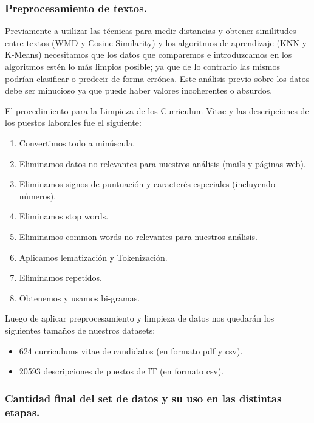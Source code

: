 \documentclass[12pt,a4paper]{article}
\begin{document}
\begin{sloppypar}
\cleardoublepage

\subsubsection{Preprocesamiento de textos.}
Previamente a utilizar las técnicas para medir distancias y obtener similitudes entre textos (WMD y Cosine Similarity) y los algoritmos de aprendizaje (KNN y K-Means) necesitamos que los datos que comparemos e introduzcamos en los algoritmos estén lo más limpios posible; ya que de lo contrario las mismos podrían clasificar o predecir de forma errónea. Este análisis previo sobre los datos debe ser minucioso ya que puede haber valores incoherentes o absurdos.

El procedimiento para la Limpieza de los Curriculum Vitae y las descripciones de los puestos laborales fue el siguiente:

\begin{enumerate}
\item Convertimos todo a minúscula.
\item Eliminamos datos no relevantes para nuestros análisis (mails y páginas web).
\item Eliminamos signos de puntuación y caracterés especiales (incluyendo números).
\item Eliminamos stop words.
\item Eliminamos common words no relevantes para nuestros análisis.
\item Aplicamos lematización y Tokenización.
\item Eliminamos repetidos.
\item Obtenemos y usamos bi-gramas.
\end{enumerate}

Luego de aplicar preprocesamiento y limpieza de datos nos quedarán los siguientes tamaños de nuestros datasets:
\begin{itemize}
\item 624 curriculums vitae de candidatos (en formato pdf y csv).
\item 20593 descripciones de puestos de IT (en formato csv).
\end{itemize}

\cleardoublepage

\subsubsection{Cantidad final del set de datos y su uso en las distintas etapas.}


\end{sloppypar}
\end{document}
